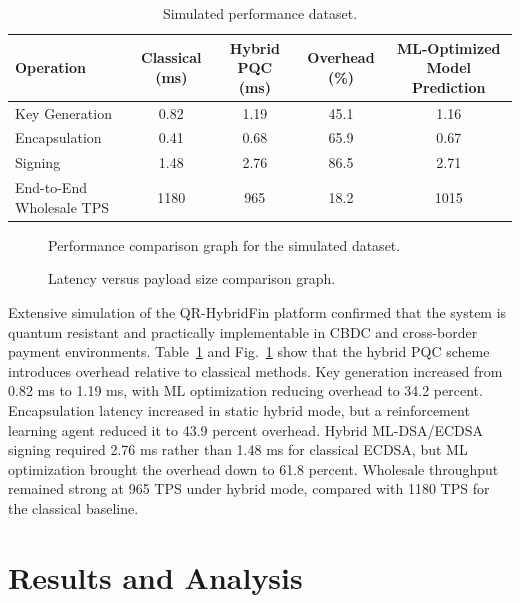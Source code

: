 \documentclass[pdflatex,sn-basic,english]{sn-jnl}
\begin{document}
\begin{table}[htbp]
\centering
\caption{Simulated performance dataset.}
\label{tab:performance}
\begin{tabular}{lcccc}
\toprule
Operation & Classical (ms) & Hybrid PQC (ms) & Overhead (\%) & ML-Optimized Model Prediction \\
\midrule
Key Generation & 0.82 & 1.19 & 45.1 & 1.16 \\
Encapsulation & 0.41 & 0.68 & 65.9 & 0.67 \\
Signing & 1.48 & 2.76 & 86.5 & 2.71 \\
End-to-End Wholesale TPS & 1180 & 965 & 18.2 & 1015 \\
\bottomrule
\end{tabular}
\end{table}

\begin{figure}[htbp]
\centering
{}
\caption{Performance comparison graph for the simulated dataset.}
\label{fig:comparison}
\end{figure}

\begin{figure}[htbp]
\centering
{}
\caption{Latency versus payload size comparison graph.}
\label{fig:latency}
\end{figure}

Extensive simulation of the QR-HybridFin platform confirmed that the system is quantum resistant and practically implementable in CBDC and cross-border payment environments. Table~\ref{tab:performance} and Fig.~\ref{fig:comparison} show that the hybrid PQC scheme introduces overhead relative to classical methods. Key generation increased from 0.82 ms to 1.19 ms, with ML optimization reducing overhead to 34.2 percent. Encapsulation latency increased in static hybrid mode, but a reinforcement learning agent reduced it to 43.9 percent overhead. Hybrid ML-DSA/ECDSA signing required 2.76 ms rather than 1.48 ms for classical ECDSA, but ML optimization brought the overhead down to 61.8 percent. Wholesale throughput remained strong at 965 TPS under hybrid mode, compared with 1180 TPS for the classical baseline.

\section{Results and Analysis}
\end{document}
